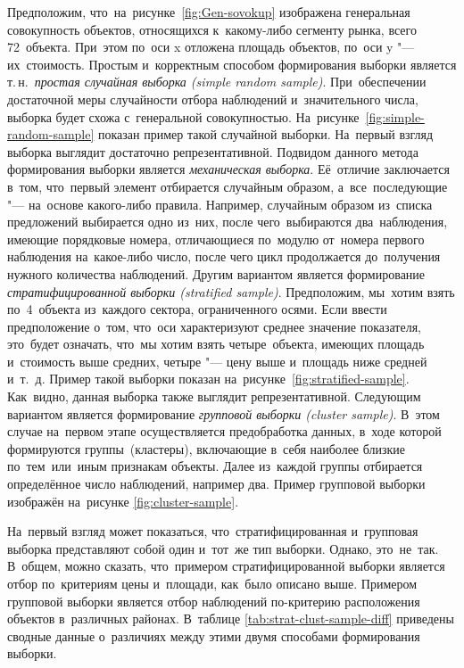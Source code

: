 \documentclass[]{scrartcl}
\begin{document}
Предположим, что~на~рисунке~\ref{fig:Gen-sovokup} изображена генеральная совокупность объектов, относящихся к~какому-либо сегменту рынка, всего 72~объекта. При~этом по~оси x отложена площадь объектов, по~оси y "--- их~стоимость. Простым и~корректным способом формирования выборки является т.\,н.~\emph{простая случайная выборка (\foreignlanguage{english}{simple random sample})}. При~обеспечении достаточной меры случайности отбора наблюдений и~значительного числа, выборка будет схожа с~генеральной совокупностью. На~рисунке~\ref{fig:simple-random-sample} показан пример такой случайной выборки. На~первый взгляд выборка выглядит достаточно репрезентативной. Подвидом данного метода формирования выборки является \emph{механическая выборка}. Её~отличие заключается в~том, что~первый элемент отбирается случайным образом, а~все~последующие "--- на~основе какого-либо правила. Например, случайным образом из~списка предложений выбирается одно из~них, после чего~выбираются два~наблюдения, имеющие порядковые номера, отличающиеся по~модулю от~номера первого наблюдения на~какое-либо число, после чего цикл продолжается до~получения нужного количества наблюдений. Другим вариантом является формирование \emph{стратифицированной выборки (\foreignlanguage{english}{stratified sample})}. Предположим, мы~хотим взять по~4~объекта из~каждого сектора, ограниченного осями. Если ввести предположение о~том, что~оси характеризуют среднее значение показателя, это~будет означать, что~мы хотим взять четыре~объекта, имеющих площадь и~стоимость выше средних, четыре "--- цену выше и~площадь ниже средней и~т.~д. Пример такой выборки показан на~рисунке~\ref{fig:stratified-sample}. Как~видно, данная выборка также выглядит репрезентативной. Следующим вариантом является формирование \emph{групповой выборки (\foreignlanguage{english}{cluster sample})}. В~этом случае на~первом этапе осуществляется предобработка данных, в~ходе которой формируются группы~(кластеры), включающие в~себя наиболее близкие по~тем~или~иным признакам объекты. Далее из~каждой группы отбирается определённое число наблюдений, например два. Пример групповой выборки изображён на~рисунке \ref{fig:cluster-sample}.
\par
На~первый взгляд может показаться, что~стратифицированная и~групповая выборка представляют собой один и~тот~же тип выборки. Однако, это~не~так. В~общем, можно сказать, что~примером стратифицированной выборки является отбор по~критериям цены и~площади, как~было описано выше. Примером групповой выборки является отбор наблюдений по-критерию расположения объектов в~различных районах. В~таблице \ref{tab:strat-clust-sample-diff} приведены сводные данные о~различиях между этими двумя способами формирования выборки.
\end{document}

